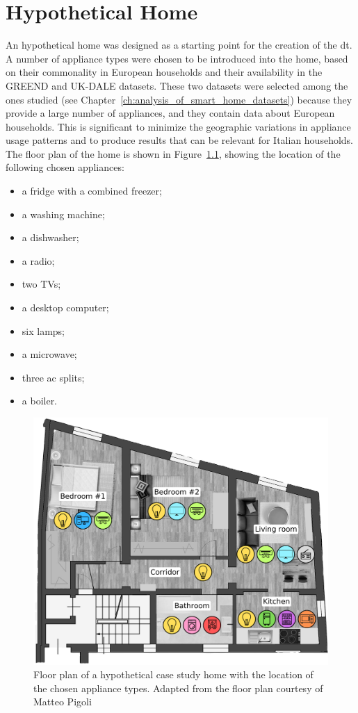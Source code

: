 \chapter{Hypothetical Home}\label{ch:hypothetical_home}

An hypothetical home was designed as a starting point for the creation of the \acrshort{dt}. A number of appliance types were chosen to be introduced into the home, based on their commonality in European households and their availability in the GREEND and UK-DALE datasets. These two datasets were selected among the ones studied (see Chapter~\ref{ch:analysis_of_smart_home_datasets}) because they provide a large number of appliances, and they contain data about European households. This is significant to minimize the geographic variations in appliance usage patterns and to produce results that can be relevant for Italian households. The floor plan of the home is shown in Figure~\ref{fig:home_floor_plan}, showing the location of the following chosen appliances:
\begin{itemize}
  \item a fridge with a combined freezer;
  \item a washing machine;
  \item a dishwasher;
  \item a radio;
  \item two TVs;
  \item a desktop computer;
  \item six lamps;
  \item a microwave;
  \item three \acrshort{ac} splits;
  \item a boiler.
\end{itemize}

\begin{figure}
  \centering
  \includegraphics[width=0.7\linewidth]{images/floor_plan.png}
  \caption[Floor plan of a hypothetical case study home with the location of the chosen appliance types]{Floor plan of a hypothetical case study home with the location of the chosen appliance types. Adapted from the floor plan courtesy of Matteo Pigoli}
  \label{fig:home_floor_plan}
\end{figure}

